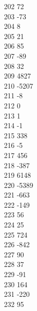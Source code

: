 { 202	72 \\
 203	-73 \\
 204	8 \\
 205	21 \\
 206	85 \\
 207	-89 \\
 208	32 \\
 209	4827 \\
 210	-5207 \\
 211	-8 \\
 212	0 \\
 213	1 \\
 214	-1 \\
 215	338 \\
 216	-5 \\
 217	456 \\
 218	-387 \\
 219	6148 \\
 220	-5389 \\
 221	-663 \\
 222	-149 \\
 223	56 \\
 224	25 \\
 225	724 \\
 226	-842 \\
 227	90 \\
 228	37 \\
 229	-91 \\
 230	164 \\
 231	-220 \\
 232	95 \\
}

